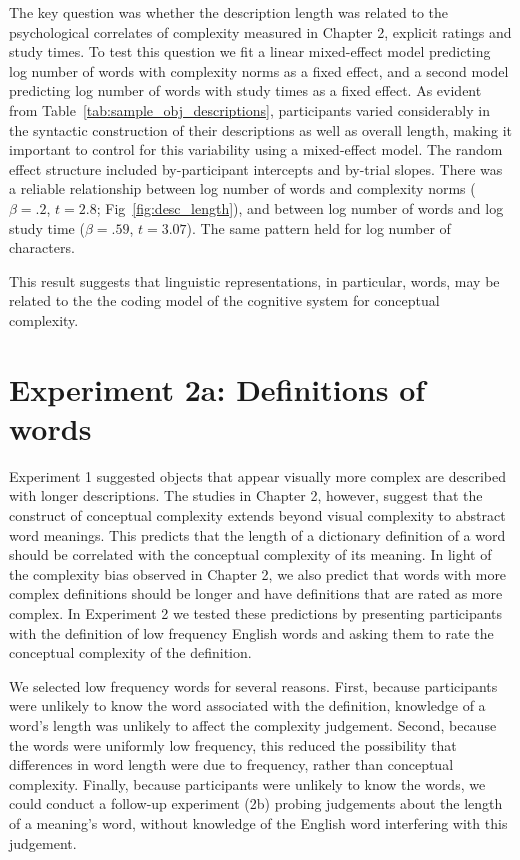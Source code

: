 The key question was whether the description length was related to the psychological correlates of complexity measured in Chapter 2, explicit ratings and study times.
To test this question we fit a  linear mixed-effect model predicting log number of words with complexity norms as a fixed effect, and a second model predicting log number of words with study times as a fixed effect. As evident from Table~\ref{tab:sample_obj_descriptions}, participants varied considerably in the  syntactic construction of their descriptions as well as overall  length, making it important to control for this variability using a  mixed-effect model. The random effect structure included by-participant intercepts and by-trial slopes. There was a reliable relationship between log number of words and  complexity norms ($\beta=.2$, $t =2.8$; Fig~\ref{fig:desc_length}), and between log number of words and log study time ($\beta=.59$, $t =3.07$). The same pattern held for log number of characters. 

This result suggests that linguistic representations, in particular, words, may be related to the the coding model of the cognitive system for conceptual complexity.

\section{Experiment 2a: Definitions of words}
Experiment 1 suggested objects that appear visually more complex are described with longer descriptions. The studies in Chapter 2, however, suggest that the construct of conceptual complexity extends beyond visual complexity to abstract word meanings. This predicts that the length of a dictionary definition of a word should be correlated with the conceptual complexity of its meaning. In light of the complexity bias observed in Chapter 2, we also predict that words with more complex definitions should be longer and have definitions that are rated as more complex. In Experiment 2 we tested these predictions by presenting participants with the definition of low frequency English words  and asking them to rate the conceptual complexity of the definition.

We selected low frequency words for several reasons. First, because participants were unlikely to know the word associated with the definition, knowledge of a word's length was unlikely to affect the complexity judgement. Second, because the words were uniformly low frequency, this reduced the possibility that differences in word length were due to frequency, rather than conceptual complexity. Finally, because participants were unlikely to know the words, we could conduct a follow-up experiment (2b) probing judgements about the length of a meaning's word, without knowledge of the English word interfering with this judgement.

